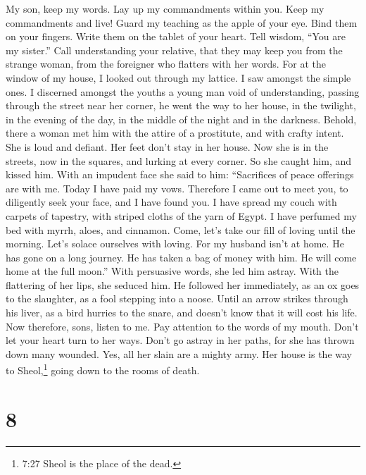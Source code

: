  My son, keep my words. Lay up my commandments within you.
 Keep my commandments and live! Guard my teaching as the
apple of your eye.  Bind them on your fingers. Write them on
the tablet of your heart.  Tell wisdom, ``You are my
sister.'' Call understanding your relative,  that they may
keep you from the strange woman, from the foreigner who flatters with
her words.  For at the window of my house, I looked out
through my lattice.  I saw amongst the simple ones. I
discerned amongst the youths a young man void of understanding,
 passing through the street near her corner, he went the way
to her house,  in the twilight, in the evening of the day,
in the middle of the night and in the darkness.  Behold,
there a woman met him with the attire of a prostitute, and with crafty
intent.  She is loud and defiant. Her feet don't stay in
her house.  Now she is in the streets, now in the squares,
and lurking at every corner.  So she caught him, and kissed
him. With an impudent face she said to him:  ``Sacrifices
of peace offerings are with me. Today I have paid my vows. 
Therefore I came out to meet you, to diligently seek your face, and I
have found you.  I have spread my couch with carpets of
tapestry, with striped cloths of the yarn of Egypt.  I have
perfumed my bed with myrrh, aloes, and cinnamon.  Come,
let's take our fill of loving until the morning. Let's solace ourselves
with loving.  For my husband isn't at home. He has gone on
a long journey.  He has taken a bag of money with him. He
will come home at the full moon.''  With persuasive words,
she led him astray. With the flattering of her lips, she seduced him.
 He followed her immediately, as an ox goes to the
slaughter, as a fool stepping into a noose.  Until an arrow
strikes through his liver, as a bird hurries to the snare, and doesn't
know that it will cost his life.  Now therefore, sons,
listen to me. Pay attention to the words of my mouth. 
Don't let your heart turn to her ways. Don't go astray in her paths,
 for she has thrown down many wounded. Yes, all her slain
are a mighty army.  Her house is the way to
Sheol,\footnote{7:27 Sheol is the place of the dead.} going down to the
rooms of death.

\hypertarget{section-7}{%
\section{8}\label{section-7}}

